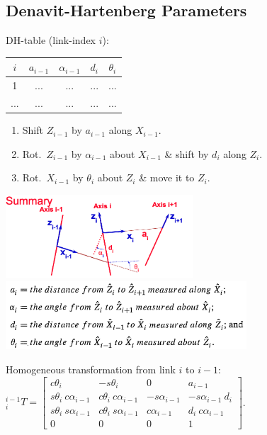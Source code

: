 \subsection{Denavit-Hartenberg Parameters}

\begin{minipage}[c]{0.1\textwidth}
DH-table (link-index $i$):
\end{minipage}
\hfill
\begin{minipage}[l]{0.25\textwidth}
\begin{tabular}{ |c|c|c|c|c| } 
\hline
$i$ & $a_{i-1}$ & $\alpha_{i-1}$ & $d_i$ & $\theta_i$ \\
\hline
1 & ... & ... & ... & ... \\ 
\hline
... & ... & ... & ... & ... \\ 
\hline
\end{tabular}
\end{minipage}
\hfill
\begin{minipage}[c]{0.6\textwidth}
\begin{center}
\begin{enumerate}
	\item Shift $Z_{i-1}$ by $a_{i-1}$ along $X_{i-1}$.
	\item Rot.\ $Z_{i-1}$ by $\alpha_{i-1}$ about $X_{i-1}$ \& shift by $d_i$ along $Z_i$.
	\item Rot.\ $X_{i-1}$ by $\theta_i$ about $Z_{i}$ \& move it to $Z_i$.
\end{enumerate}
\end{center}
\end{minipage}
\begin{center}
	\includegraphics[width=7cm]{sections/imgs/2_dh_params.png}
	\includegraphics[width=9cm]{sections/imgs/11.png}
\end{center}
Homogeneous transformation from link $i$ to $i-1$:\quad	${ }^{i-1}_iT=\left[\begin{array}{ccc|c}
c \theta_{i} & -s \theta_{i} & 0 & a_{i-1} \\
s \theta_{i}\ c \alpha_{i-1} & c \theta_{i}\ c \alpha_{i-1} & -s \alpha_{i-1} & - s \alpha_{i-1}\ d_{i} \\
s \theta_{i}\ s \alpha_{i-1} & c \theta_{i}\ s \alpha_{i-1} & c \alpha_{i-1} & d_{i}\ c \alpha_{i-1} \\
\hline 0 & 0 & 0 & 1
\end{array}\right]$.\\
